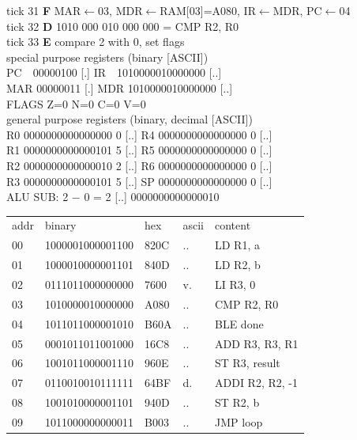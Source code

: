 \noindent\begin{tcolorbox}[stepbox, title={Instruction 11 \hfill ticks 31 to 33 \quad CMP R2, R0}]
\textcolor{dim}{tick 31} \textbf{F} MAR$\leftarrow$03, MDR$\leftarrow$RAM[03]=A080, IR$\leftarrow$MDR, PC$\leftarrow$04\\
\textcolor{dim}{tick 32} \textbf{D} 1010 000 010 000 000 = CMP R2, R0\\
\textcolor{dim}{tick 33} \textbf{E} compare 2 with 0, set flags\\[2pt]
\textcolor{dim}{special purpose registers (binary [ASCII])}\\
PC~~00000100 [.] \hfill IR~~1010000010000000 [..]\\
MAR 00000011 [.] \hfill MDR 1010000010000000 [..]\\
FLAGS Z=0 N=0 C=0 V=0\\[2pt]
\textcolor{dim}{general purpose registers (binary, decimal [ASCII])}\\
R0 0000000000000000 0 [..] \hfill R4 0000000000000000 0 [..]\\
R1 0000000000000101 5 [..] \hfill R5 0000000000000000 0 [..]\\
R2 0000000000000010 2 [..] \hfill R6 0000000000000000 0 [..]\\
R3 0000000000000101 5 [..] \hfill SP 0000000000000000 0 [..]\\
\textcolor{dim}{ALU} SUB: 2 $-$ 0 = 2 [..] \hfill 0000000000000010\\[2pt]
{\setlength{\tabcolsep}{2pt}\begin{tabular}{@{}lllll@{}}
\textcolor{dim}{addr} & \textcolor{dim}{binary} & \textcolor{dim}{hex} & \textcolor{dim}{ascii} & \textcolor{dim}{content}\\
00 & 1000001000001100 & 820C & .. & LD R1, a\\
01 & 1000010000001101 & 840D & .. & LD R2, b\\
02 & 0111011000000000 & 7600 & v. & LI R3, 0\\
03 & 1010000010000000 & A080 & .. & CMP R2, R0\\
\rowcolor{pcc}04 & 1011011000001010 & B60A & .. & BLE done\\
05 & 0001011011001000 & 16C8 & .. & ADD R3, R3, R1\\
06 & 1001011000001110 & 960E & .. & ST R3, result\\
07 & 0110010010111111 & 64BF & d. & ADDI R2, R2, -1\\
08 & 1001010000001101 & 940D & .. & ST R2, b\\
09 & 1011000000000011 & B003 & .. & JMP loop\\

\end{tabular}}
\end{tcolorbox}
